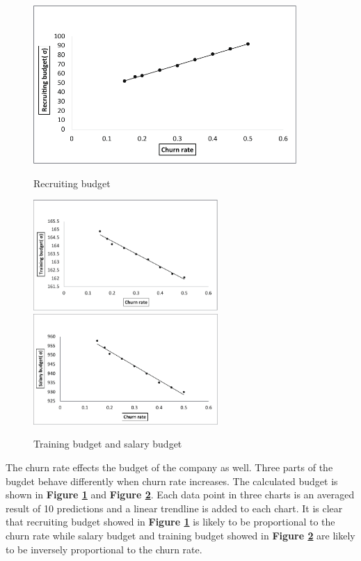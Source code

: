 \documentclass[12pt,a4paper,titlepage]{article}
\begin{document}
\begin{figure}[htb]
  \centering
  \includegraphics[width=10cm]{task4_r.pdf}\\
  \caption{Recruiting budget}\label{t4_r}
\end{figure}
\begin{figure}[htb]
  \centering
  \includegraphics[width=7cm]{task4_t.pdf}
  \includegraphics[width=7cm]{task4_s.pdf}\\
  \caption{Training budget and salary budget}\label{t4_t_s}
\end{figure}
The churn rate effects the budget of the company as well. Three
parts of the bugdet behave differently when churn rate increases. The
calculated budget is shown in \textbf{Figure \ref{t4_r}} and \textbf{Figure
\ref{t4_t_s}}. Each data point in three charts is an averaged result of
10 predictions and a linear trendline is added to each chart. It is
clear that recruiting budget showed in \textbf{Figure \ref{t4_r}} is likely to
be proportional to the churn rate while salary budget and training
budget showed in \textbf{Figure \ref{t4_t_s}} are likely to be inversely
proportional to the churn rate.
\end{document}
